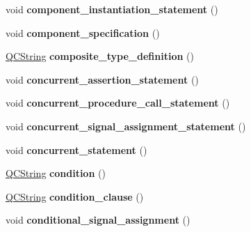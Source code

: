 \begin{DoxyCompactItemize}
void {\bfseries component\+\_\+instantiation\+\_\+statement} ()
\item 
\mbox{\label{classvhdl_1_1parser_1_1_vhdl_parser_af08e8b1e48ff69171225964970d1a6eb}} 
void {\bfseries component\+\_\+specification} ()
\item 
\mbox{\label{classvhdl_1_1parser_1_1_vhdl_parser_aa6b1b94c683528def05476d03a8215f4}} 
\mbox{\hyperlink{class_q_c_string}{Q\+C\+String}} {\bfseries composite\+\_\+type\+\_\+definition} ()
\item 
\mbox{\label{classvhdl_1_1parser_1_1_vhdl_parser_a6806e4127f050ffd9ee7e10d18379d66}} 
void {\bfseries concurrent\+\_\+assertion\+\_\+statement} ()
\item 
\mbox{\label{classvhdl_1_1parser_1_1_vhdl_parser_af48b986b5234d389fe7edc6c8b12bf2a}} 
void {\bfseries concurrent\+\_\+procedure\+\_\+call\+\_\+statement} ()
\item 
\mbox{\label{classvhdl_1_1parser_1_1_vhdl_parser_a4d9a9abf094102398a8ef327307ffd84}} 
void {\bfseries concurrent\+\_\+signal\+\_\+assignment\+\_\+statement} ()
\item 
\mbox{\label{classvhdl_1_1parser_1_1_vhdl_parser_ad63422e0d000e73a0d641847370263e7}} 
void {\bfseries concurrent\+\_\+statement} ()
\item 
\mbox{\label{classvhdl_1_1parser_1_1_vhdl_parser_a380b02a21d7ac864d2c0fb17466c27bf}} 
\mbox{\hyperlink{class_q_c_string}{Q\+C\+String}} {\bfseries condition} ()
\item 
\mbox{\label{classvhdl_1_1parser_1_1_vhdl_parser_a2a2127cc803d635a25c6aee5a588797b}} 
\mbox{\hyperlink{class_q_c_string}{Q\+C\+String}} {\bfseries condition\+\_\+clause} ()
\item 
\mbox{\label{classvhdl_1_1parser_1_1_vhdl_parser_a06b60bdaaf53fd91eba74e43e4e43461}} 
void {\bfseries conditional\+\_\+signal\+\_\+assignment} ()

\end{DoxyCompactItemize}
